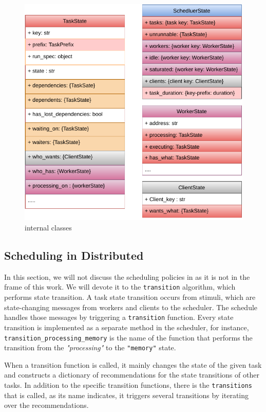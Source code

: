 \begin{figure}[tb]\centering
\includegraphics{figures/DaskScheduler.pdf}
\caption{\dask internal classes }
\label{figdaskinternal}
\end{figure}

\subsection{Scheduling in \dask Distributed}
In this section, we will not discuss the scheduling policies in \dask as it is not in the frame of this work. We will devote it to the \texttt{transition} algorithm, which performs state transition.
A task state transition occurs from stimuli, which are state-changing messages from workers and clients to the scheduler. 
The schedule handles those messages by triggering a \texttt{transition} function. Every state transition is implemented as a separate method in the scheduler, for instance, \texttt{transition\_processing\_memory} is the name of the function that performs the transition from the \textit{"processing"} to the \texttt{"memory"} state.

When a transition function is called, it mainly changes the state of the given task and constructs a dictionary of recommendations for the state transitions of other tasks. In addition to the specific transition functions, there is the \texttt{transitions} that is called, as its name indicates, it triggers several transitions by iterating over the recommendations. 

